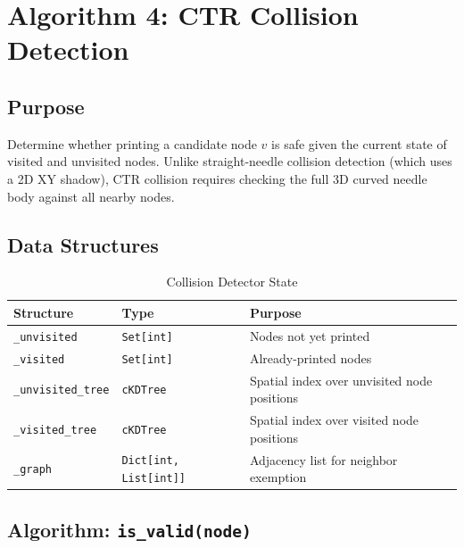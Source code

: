 \documentclass[11pt,a4paper]{article}
\newcommand{\funcname}[1]{\texttt{\textcolor{codepurple}{#1}}}
\begin{document}
\section{Algorithm 4: CTR Collision Detection}
\label{sec:collision}

\subsection{Purpose}

Determine whether printing a candidate node $v$ is safe given the current state of visited and unvisited nodes. Unlike straight-needle collision detection (which uses a 2D XY shadow), CTR collision requires checking the full 3D curved needle body against all nearby nodes.

\subsection{Data Structures}

\begin{table}[H]
\centering
\caption{Collision Detector State}
\begin{tabular}{llp{6cm}}
\toprule
\textbf{Structure} & \textbf{Type} & \textbf{Purpose} \\
\midrule
\texttt{\_unvisited} & \texttt{Set[int]} & Nodes not yet printed \\
\texttt{\_visited} & \texttt{Set[int]} & Already-printed nodes \\
\texttt{\_unvisited\_tree} & \texttt{cKDTree} & Spatial index over unvisited node positions \\
\texttt{\_visited\_tree} & \texttt{cKDTree} & Spatial index over visited node positions \\
\texttt{\_graph} & \texttt{Dict[int, List[int]]} & Adjacency list for neighbor exemption \\
\bottomrule
\end{tabular}
\end{table}

\subsection{Algorithm: \funcname{is\_valid(node)}}
\end{document}
